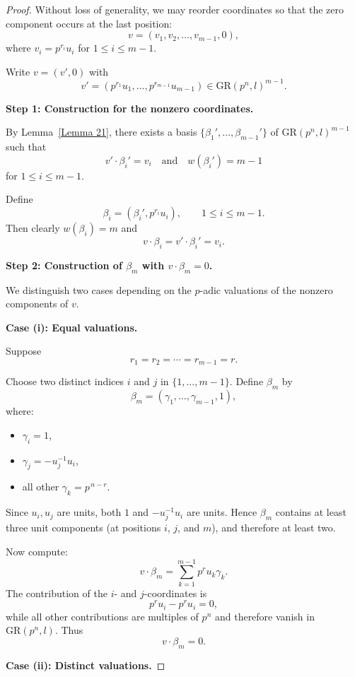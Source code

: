 \documentclass[10pt]{article}
\theoremstyle{definition}
\begin{document}
\begin{proof}
Without loss of generality, we may reorder coordinates so that
the zero component occurs at the last position:
\[
v=(v_1,v_2,\dots,v_{m-1},0),
\]
where $v_i=p^{r_i}u_i$ for $1\le i\le m-1$.

Write $v=(v',0)$ with
\[
v'=(p^{r_1}u_1,\dots,p^{r_{m-1}}u_{m-1})
\in \mathrm{GR}(p^n,l)^{m-1}.
\]

\medskip
\noindent
\textbf{Step 1: Construction for the nonzero coordinates.}

By Lemma~\ref{Lemma 21}, there exists a basis
$\{\beta_1',\dots,\beta_{m-1}'\}$
of $\mathrm{GR}(p^n,l)^{m-1}$ such that
\[
v'\cdot \beta_i'=v_i
\quad\text{and}\quad
w(\beta_i')=m-1
\]
for $1\le i\le m-1$.

Define
\[
\beta_i=(\beta_i',p^{r_i}u_i),
\qquad
1\le i\le m-1.
\]
Then clearly $w(\beta_i)=m$ and
\[
v\cdot \beta_i
=
v'\cdot \beta_i'
=
v_i.
\]

\medskip
\noindent
\textbf{Step 2: Construction of $\beta_m$ with $v\cdot \beta_m=0$.}

We distinguish two cases depending on the $p$-adic valuations
of the nonzero components of $v$.

\medskip
\noindent
\textbf{Case (i): Equal valuations.}

Suppose
\[
r_1=r_2=\cdots=r_{m-1}=r.
\]

Choose two distinct indices $i$ and $j$ in $\{1,\dots,m-1\}$.
Define $\beta_m$ by
\[
\beta_m=(\gamma_1,\dots,\gamma_{m-1},1),
\]
where:

\begin{itemize}
\item $\gamma_i=1$,
\item $\gamma_j=-u_j^{-1}u_i$,
\item all other $\gamma_k=p^{\,n-r}$.
\end{itemize}

Since $u_i,u_j$ are units, both $1$ and $-u_j^{-1}u_i$ are units.
Hence $\beta_m$ contains at least three unit components
(at positions $i$, $j$, and $m$), and therefore at least two.

Now compute:
\[
v\cdot \beta_m
=
\sum_{k=1}^{m-1} p^r u_k \gamma_k.
\]
The contribution of the $i$- and $j$-coordinates is
\[
p^r u_i - p^r u_i =0,
\]
while all other contributions are multiples of $p^n$
and therefore vanish in $\mathrm{GR}(p^n,l)$.
Thus
\[
v\cdot \beta_m=0.
\]

\medskip
\noindent
\textbf{Case (ii): Distinct valuations.}


\end{proof}
\end{document}
